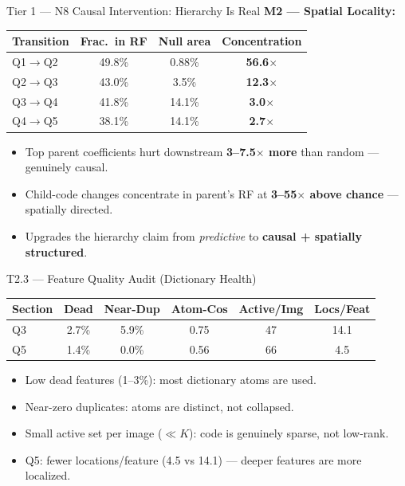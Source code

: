 \documentclass[final]{beamer}
\newlength{\colwidth}
\begin{document}
\begin{frame}[t]
\begin{columns}[t]
\begin{column}{\colwidth}
\begin{block}{Tier 1 --- N8 Causal Intervention: Hierarchy Is Real}
\vspace{0.3em}
\textbf{M2 --- Spatial Locality:}
\begin{center}
\begin{tabular}{@{}lccc@{}}
\toprule
\textbf{Transition} & \textbf{Frac.\ in RF} & \textbf{Null area} & \textbf{Concentration} \\
\midrule
Q1$\to$Q2 & 49.8\% & 0.88\% & \textbf{56.6$\times$} \\
Q2$\to$Q3 & 43.0\% & 3.5\% & \textbf{12.3$\times$} \\
Q3$\to$Q4 & 41.8\% & 14.1\% & \textbf{3.0$\times$} \\
Q4$\to$Q5 & 38.1\% & 14.1\% & \textbf{2.7$\times$} \\
\bottomrule
\end{tabular}
\end{center}

\begin{itemize}[leftmargin=1.5em,itemsep=1pt]
  \item Top parent coefficients hurt downstream \textbf{3--7.5$\times$ more} than random --- genuinely causal.
  \item Child-code changes concentrate in parent's RF at \textbf{3--55$\times$ above chance} --- spatially directed.
  \item Upgrades the hierarchy claim from \emph{predictive} to \textbf{causal + spatially structured}.
\end{itemize}
\end{block}

\vspace{0.5em}

\begin{block}{T2.3 --- Feature Quality Audit (Dictionary Health)}
\small
\begin{center}
\begin{tabular}{@{}lccccc@{}}
\toprule
\textbf{Section} & \textbf{Dead} & \textbf{Near-Dup} & \textbf{Atom-Cos} & \textbf{Active/Img} & \textbf{Locs/Feat} \\
\midrule
Q3 & 2.7\% & 5.9\% & 0.75 & 47 & 14.1 \\
Q5 & 1.4\% & 0.0\% & 0.56 & 66 & 4.5 \\
\bottomrule
\end{tabular}
\end{center}
\begin{itemize}[leftmargin=1.5em,itemsep=1pt]
  \item Low dead features (1--3\%): most dictionary atoms are used.
  \item Near-zero duplicates: atoms are distinct, not collapsed.
  \item Small active set per image ($\ll K$): code is genuinely sparse, not low-rank.
  \item Q5: fewer locations/feature (4.5 vs 14.1) --- deeper features are more localized.
\end{itemize}
\end{block}


\end{column}
\end{columns}
\end{frame}
\end{document}
